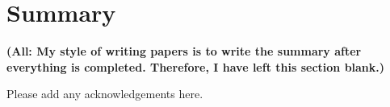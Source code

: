 \documentclass[manuscript]{aastex} %
\begin{document}
\section{Summary}

\noindent
{\bf (All: My style of writing papers is to write the summary after everything is completed.  Therefore, I have left this
section blank.)}


\acknowledgements
Please add any acknowledgements here.





\newpage



\end{document}
